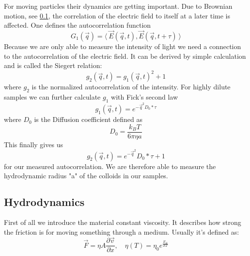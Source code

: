 \documentclass[]{article}
\begin{document}
For moving particles their dynamics are getting important. Due to Brownian motion, see \ref{hyd}, the correlation of the electric field to itself at a later time is affected. One defines the autocorrelation function 
\begin{equation}\label{eq:g1}
G_1(\vec{q}) = \langle \: \vec{E}(\vec{q},t),\vec{E}(\vec{q},t+\tau) \: \rangle
\end{equation} 
Because we are only able to measure the intensity of light we need a connection to the autocorrelation of the electric field. It can be derived by simple calculation and is called the Siegert relation:
\begin{equation}\label{eq:siegert}
g_2(\vec{q},t) = g_1(\vec{q},t )^2 +1
\end{equation}
where $g_2$ is the normalized autocorrelation of the intensity. For highly dilute samples we can further calculate $g_1$ with Fick's second law
\begin{equation}\label{eq:g1solved}
g_1(\vec{q},t )=e^{-\vec{q}^{2}D_0*\tau}
\end{equation}
where $D_0$ is the Diffusion coefficient defined as 
\begin{equation}\label{eq:StokesEinstein}
D_0=\frac{k_BT}{6\pi \eta a}
\end{equation}
This finally gives us 
\begin{equation}\label{eq:g2}
\boxed{g_2(\vec{q},t) =e^{- \vec{q}^{2}}D_0*\tau+1}
\end{equation}
for our measured autocorrelation. We are therefore able to measure the hydrodynamic radius "a" of the colloids in our samples.


\subsection{Hydrodynamics}
\label{hyd}
First of all we introduce the material constant viscosity. It describes how strong the friction is for moving something through a medium. Usually it's defined as: 
\begin{equation}
\vec{F}=\eta A \frac{\partial \vec{v}}{\partial x} , \quad \eta(T)= \eta_0 e^{\frac{E_A}{RT}}
\end{equation}

\end{document}
